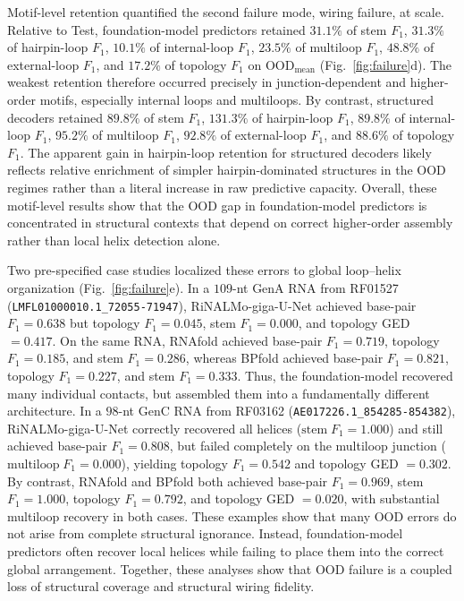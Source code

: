 \documentclass[pdflatex,sn-mathphys-num]{sn-jnl}%
\theoremstyle{thmstyleone}%
\theoremstyle{thmstyletwo}%
\theoremstyle{thmstylethree}%
\begin{document}
Motif-level retention quantified the second failure mode, wiring failure, at scale.
Relative to Test, foundation-model predictors retained $31.1\%$ of stem $F_1$, $31.3\%$ of hairpin-loop $F_1$, $10.1\%$ of internal-loop $F_1$, $23.5\%$ of multiloop $F_1$, $48.8\%$ of external-loop $F_1$, and $17.2\%$ of topology $F_1$ on $\mathrm{OOD}_{\mathrm{mean}}$ (Fig.~\ref{fig:failure}d).
The weakest retention therefore occurred precisely in junction-dependent and higher-order motifs, especially internal loops and multiloops.
By contrast, structured decoders retained $89.8\%$ of stem $F_1$, $131.3\%$ of hairpin-loop $F_1$, $89.8\%$ of internal-loop $F_1$, $95.2\%$ of multiloop $F_1$, $92.8\%$ of external-loop $F_1$, and $88.6\%$ of topology $F_1$.
The apparent gain in hairpin-loop retention for structured decoders likely reflects relative enrichment of simpler hairpin-dominated structures in the OOD regimes rather than a literal increase in raw predictive capacity.
Overall, these motif-level results show that the OOD gap in foundation-model predictors is concentrated in structural contexts that depend on correct higher-order assembly rather than local helix detection alone.

Two pre-specified case studies localized these errors to global loop--helix organization (Fig.~\ref{fig:failure}e).
In a $109$-nt GenA RNA from RF01527 (\texttt{LMFL01000010.1\_72055-71947}), RiNALMo-giga-U-Net achieved base-pair $F_1 = 0.638$ but topology $F_1 = 0.045$, stem $F_1 = 0.000$, and topology GED $= 0.417$.
On the same RNA, RNAfold achieved base-pair $F_1 = 0.719$, topology $F_1 = 0.185$, and stem $F_1 = 0.286$, whereas BPfold achieved base-pair $F_1 = 0.821$, topology $F_1 = 0.227$, and stem $F_1 = 0.333$.
Thus, the foundation-model recovered many individual contacts, but assembled them into a fundamentally different architecture.
In a $98$-nt GenC RNA from RF03162 (\texttt{AE017226.1\_854285-854382}), RiNALMo-giga-U-Net correctly recovered all helices ($\mathrm{stem}\;F_1 = 1.000$) and still achieved base-pair $F_1 = 0.808$, but failed completely on the multiloop junction ($\mathrm{multiloop}\;F_1 = 0.000$), yielding topology $F_1 = 0.542$ and topology GED $= 0.302$.
By contrast, RNAfold and BPfold both achieved base-pair $F_1 = 0.969$, stem $F_1 = 1.000$, topology $F_1 = 0.792$, and topology GED $= 0.020$, with substantial multiloop recovery in both cases.
These examples show that many OOD errors do not arise from complete structural ignorance.
Instead, foundation-model predictors often recover local helices while failing to place them into the correct global arrangement.
Together, these analyses show that OOD failure is a coupled loss of structural coverage and structural wiring fidelity.
\end{document}
